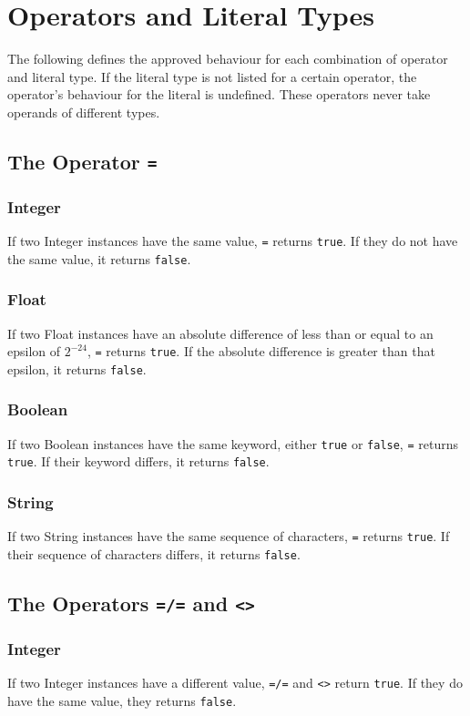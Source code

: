 \section{Operators and Literal Types}
The following defines the approved behaviour for each combination of operator and literal type. If the literal type is not listed for a certain operator, the operator's behaviour for the literal is undefined. These operators never take operands of different types.
\subsection{The Operator {\tt =}}
\subsubsection{Integer}
If two Integer instances have the same value, \verb!=! returns \verb!true!. If they do not have the same value, it returns \verb!false!.
\subsubsection{Float}
If two Float instances have an absolute difference of less than or equal to an epsilon of $2^{-24}$, \verb!=! returns \verb!true!. If the absolute difference is greater than that epsilon, it returns \verb!false!.
\subsubsection{Boolean}
If two Boolean instances have the same keyword, either \verb!true! or \verb!false!, \verb!=! returns \verb!true!. If their keyword differs, it returns \verb!false!.
\subsubsection{String}
If two String instances have the same sequence of characters, \verb!=! returns \verb!true!. If their sequence of characters differs, it returns \verb!false!.

\subsection{The Operators {\tt =/=} and {\tt <>}}
\subsubsection{Integer}
If two Integer instances have a different value, \verb!=/=! and \verb!<>! return \verb!true!. If they do have the same value, they returns \verb!false!.
